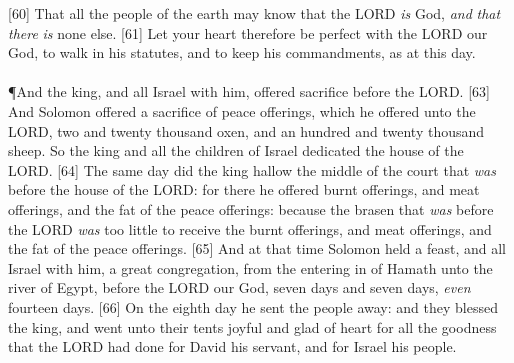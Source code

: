 [60] \textcolor[cmyk]{0.99998,1,0,0}{That all the people of the earth may know that the LORD \emph{is} God, \emph{and} \emph{that} \emph{there} \emph{is} none else.}
[61] \textcolor[cmyk]{0.99998,1,0,0}{Let your heart therefore be perfect with the LORD our God, to walk in his statutes, and to keep his commandments, as at this day.}\\
\\
\P \textcolor[cmyk]{0.99998,1,0,0}{And the king, and all Israel with him, offered sacrifice before the LORD.}
[63] \textcolor[cmyk]{0.99998,1,0,0}{And Solomon offered a sacrifice of peace offerings, which he offered unto the LORD, two and twenty thousand oxen, and an hundred and twenty thousand sheep. So the king and all the children of Israel dedicated the house of the LORD.}
[64] \textcolor[cmyk]{0.99998,1,0,0}{The same day did the king hallow the middle of the court that \emph{was} before the house of the LORD: for there he offered burnt offerings, and meat offerings, and the fat of the peace offerings: because the brasen  that \emph{was} before the LORD \emph{was} too little to receive the burnt offerings, and meat offerings, and the fat of the peace offerings.}
[65] \textcolor[cmyk]{0.99998,1,0,0}{And at that time Solomon held a feast, and all Israel with him, a great congregation, from the entering in of Hamath unto the river of Egypt, before the LORD our God, seven days and seven days, \emph{even} fourteen days.}
[66] \textcolor[cmyk]{0.99998,1,0,0}{On the eighth day he sent the people away: and they blessed the king, and went unto their tents joyful and glad of heart for all the goodness that the LORD had done for David his servant, and for Israel his people.}
